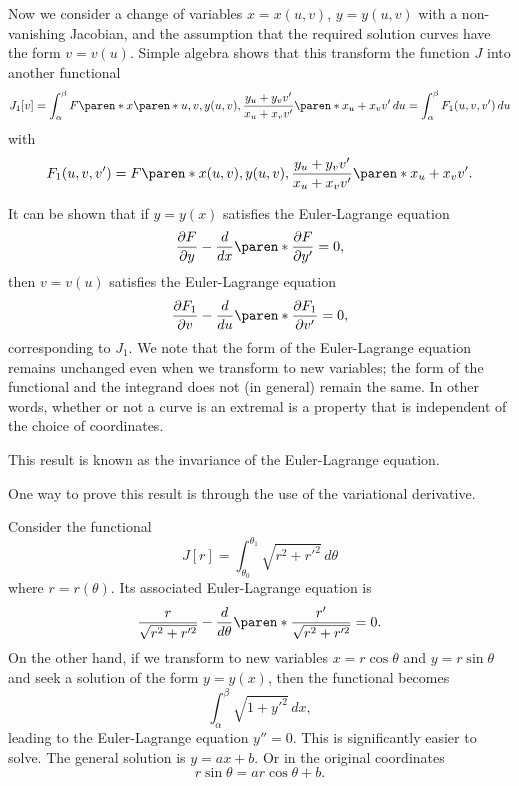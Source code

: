 \documentclass[11pt]{penrose}
\begin{document}
Now we consider a change of variables $x = x(u, v)$, $y = y(u, v)$ with a non-vanishing Jacobian, and the assumption that the required solution curves have the form $v = v(u)$. Simple algebra shows that this transform the function $J$ into another functional
\begin{equation}
    J_1 [v]
    = \int_\alpha^\beta F\paren*{x\paren*{u, v}, y(u,v), \frac{y_u + y_v v'}{x_u + x_v v'}} \paren*{x_u + x_v v'} \,du
    = \int_\alpha^\beta F_1 (u, v, v') \,du
\end{equation}
with
\begin{equation}
    F_1 (u, v, v')
    = F\paren*{x(u, v), y(u,v), \frac{y_u + y_v v'}{x_u + x_v v'}} \paren*{x_u + x_v v'}.
\end{equation}

It can be shown that if $y = y(x)$ satisfies the Euler-Lagrange equation
\begin{equation}
    \frac{\pd F}{\pd y} - \frac{d}{dx}\paren*{\frac{\pd F}{\pd y'}} = 0,
\end{equation}
then $v = v(u)$ satisfies the Euler-Lagrange equation
\begin{equation}
    \frac{\pd F_1}{\pd v} - \frac{d}{du}\paren*{\frac{\pd F_1}{\pd v'}} = 0,
\end{equation}
corresponding to $J_1$. We note that the form of the Euler-Lagrange equation remains unchanged even when we transform to new variables; the form of the functional and the integrand does not (in general) remain the same. In other words, whether or not a curve is an extremal is a property that is independent of the choice of coordinates.

This result is known as the invariance of the Euler-Lagrange equation.

One way to prove this result is through the use of the variational derivative.

\begin{negg}
    Consider the functional
    \begin{equation}
        J[r] = \int_{\theta_0}^{\theta_1} \sqrt{r^2 + r'^2} \,d\theta
    \end{equation}
    where $r = r(\theta)$. Its associated Euler-Lagrange equation is
    \begin{equation}
        \frac{r}{\sqrt{r^2 + r'^2}} - \frac{d}{d\theta}\paren*{ \frac{r'}{\sqrt{r^2 + r'^2}} } = 0.
    \end{equation}
    On the other hand, if we transform to new variables $x = r \cos\theta$ and $y = r \sin\theta$ and seek a solution of the form $y = y(x)$, then the functional becomes
    \begin{equation}
        \int_\alpha^\beta \sqrt{1 + y'^2} \,dx,
    \end{equation}
    leading to the Euler-Lagrange equation $y'' = 0$. This is significantly easier to solve. The general solution is $y = a x + b$. Or in the original coordinates
    \begin{equation}
        r \sin\theta = a r \cos\theta + b.
    \end{equation}
\end{negg}
\end{document}
